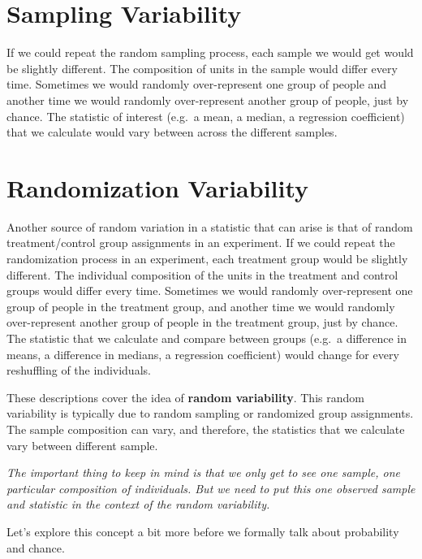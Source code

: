 \documentclass[]{book}
\begin{document}
\hypertarget{sampling-variability}{%
\section{Sampling Variability}\label{sampling-variability}}

If we could repeat the random sampling process, each sample we would get would be slightly different. The composition of units in the sample would differ every time. Sometimes we would randomly over-represent one group of people and another time we would randomly over-represent another group of people, just by chance. The statistic of interest (e.g.~a mean, a median, a regression coefficient) that we calculate would vary between across the different samples.

\hypertarget{randomization-variability}{%
\section{Randomization Variability}\label{randomization-variability}}

Another source of random variation in a statistic that can arise is that of random treatment/control group assignments in an experiment. If we could repeat the randomization process in an experiment, each treatment group would be slightly different. The individual composition of the units in the treatment and control groups would differ every time. Sometimes we would randomly over-represent one group of people in the treatment group, and another time we would randomly over-represent another group of people in the treatment group, just by chance. The statistic that we calculate and compare between groups (e.g.~a difference in means, a difference in medians, a regression coefficient) would change for every reshuffling of the individuals.

These descriptions cover the idea of \textbf{random variability}. This random variability is typically due to random sampling or randomized group assignments. The sample composition can vary, and therefore, the statistics that we calculate vary between different sample.

\emph{The important thing to keep in mind is that we only get to see one sample, one particular composition of individuals. But we need to put this one observed sample and statistic in the context of the random variability.}

Let's explore this concept a bit more before we formally talk about probability and chance.
\end{document}

